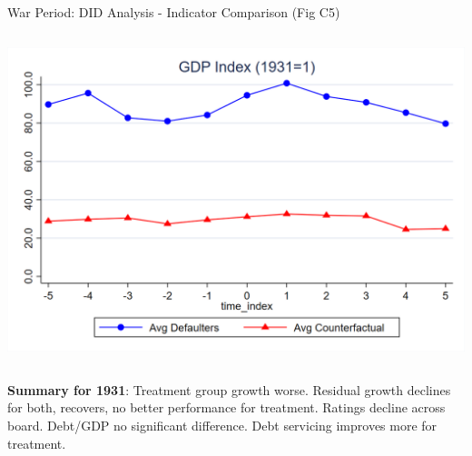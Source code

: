 \documentclass{beamer}
\begin{document}
\begin{frame}{War Period: DID Analysis - Indicator Comparison (Fig C5)}
\begin{columns}[T]
\begin{column}{0.45\textwidth}
      \includegraphics[width=0.9\linewidth]{figures/figc5_d.png}
    \end{column}
  \end{columns}
  \tiny \textbf{Summary for 1931}: Treatment group growth worse. Residual growth declines for both, recovers, no better performance for treatment. Ratings decline across board. Debt/GDP no significant difference. Debt servicing improves more for treatment.
\end{frame}
\end{document}
